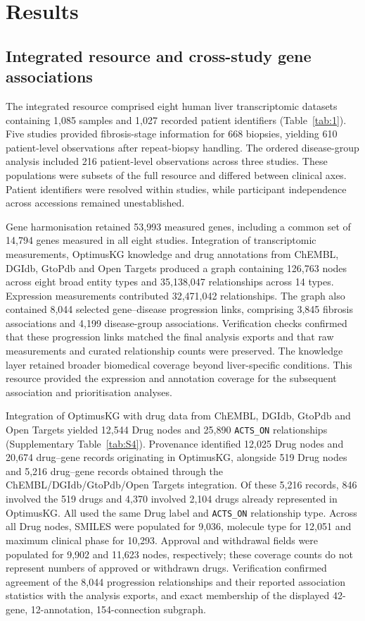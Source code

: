 \documentclass[11pt,a4paper]{article}
\begin{document}
\section*{Results}




\subsection*{Integrated resource and cross-study gene associations}
The integrated resource comprised eight human liver transcriptomic datasets containing 1,085 samples and 1,027 recorded patient identifiers (Table~\ref{tab:1}). Five studies provided fibrosis-stage information for 668 biopsies, yielding 610 patient-level observations after repeat-biopsy handling. The ordered disease-group analysis included 216 patient-level observations across three studies. These populations were subsets of the full resource and differed between clinical axes. Patient identifiers were resolved within studies, while participant independence across accessions remained unestablished.

Gene harmonisation retained 53,993 measured genes, including a common set of 14,794 genes measured in all eight studies. Integration of transcriptomic measurements, OptimusKG knowledge and drug annotations from ChEMBL, DGIdb, GtoPdb and Open Targets produced a graph containing 126,763 nodes across eight broad entity types and 35,138,047 relationships across 14 types. Expression measurements contributed 32,471,042 relationships. The graph also contained 8,044 selected gene–disease progression links, comprising 3,845 fibrosis associations and 4,199 disease-group associations. Verification checks confirmed that these progression links matched the final analysis exports and that raw measurements and curated relationship counts were preserved. The knowledge layer retained broader biomedical coverage beyond liver-specific conditions. This resource provided the expression and annotation coverage for the subsequent association and prioritisation analyses.

Integration of OptimusKG with drug data from ChEMBL, DGIdb, GtoPdb and Open Targets yielded 12,544 Drug nodes and 25,890 \texttt{ACTS\_ON} relationships (Supplementary Table~\ref{tab:S4}). Provenance identified 12,025 Drug nodes and 20,674 drug--gene records originating in OptimusKG, alongside 519 Drug nodes and 5,216 drug--gene records obtained through the ChEMBL/DGIdb/GtoPdb/Open Targets integration. Of these 5,216 records, 846 involved the 519 drugs and 4,370 involved 2,104 drugs already represented in OptimusKG. All used the same Drug label and \texttt{ACTS\_ON} relationship type. Across all Drug nodes, SMILES were populated for 9,036, molecule type for 12,051 and maximum clinical phase for 10,293. Approval and withdrawal fields were populated for 9,902 and 11,623 nodes, respectively; these coverage counts do not represent numbers of approved or withdrawn drugs. Verification confirmed agreement of the 8,044 progression relationships and their reported association statistics with the analysis exports, and exact membership of the displayed 42-gene, 12-annotation, 154-connection subgraph.
\end{document}
